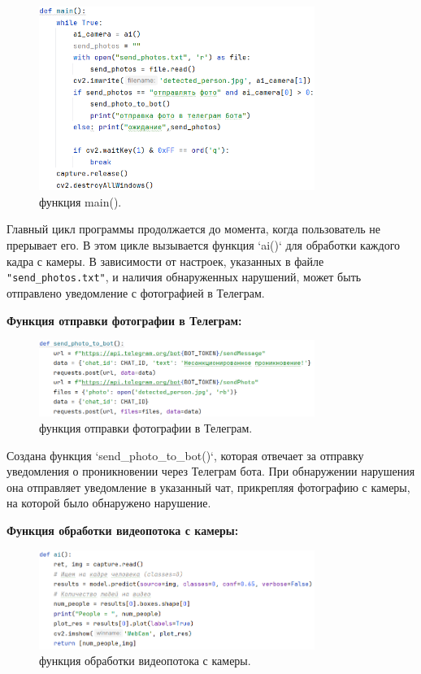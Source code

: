 \begin{figure}[h!]
	\centering
	\includegraphics[width=0.8\textwidth]{./graphics/img/image35.png}
	\caption{функция main().}
	\label{fig:img35}
\end{figure}

Главный цикл программы продолжается до момента, когда пользователь не прерывает его. В этом цикле вызывается функция `ai()` для обработки каждого кадра с камеры. В зависимости от настроек, указанных в файле \verb|"send_photos.txt"|, и наличия обнаруженных нарушений, может быть отправлено уведомление с фотографией в Телеграм.

\textbf{Функция отправки фотографии в Телеграм:}

\begin{figure}[h!]
	\centering
	\includegraphics[width=0.8\textwidth]{./graphics/img/image33.png}
	\caption{функция отправки фотографии в Телеграм.}
	\label{fig:img33}
\end{figure}

Создана функция `send\_photo\_to\_bot()`, которая отвечает за отправку уведомления о проникновении через Телеграм бота. При обнаружении нарушения она отправляет уведомление в указанный чат, прикрепляя фотографию с камеры, на которой было обнаружено нарушение.

\textbf{Функция обработки видеопотока с камеры:}

\begin{figure}[h!]
	\centering
	\label{fig:img21}
	\includegraphics[width=0.8\textwidth]{./graphics/img/image21.png}
	\caption{функция обработки видеопотока с камеры.}
\end{figure}

